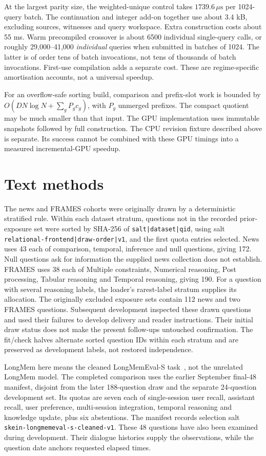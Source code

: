 At the largest parity size, the weighted-unique control takes \(1739.6\,\mu\mathrm{s}\) per 1024-query batch.
The continuation and integer add-on together use about 3.4 kB, excluding sources, witnesses and query workspace.
Extra construction costs about 55 ms.
Warm precompiled crossover is about 6500 individual single-query calls, or roughly 29,000--41,000 \emph{individual} queries when submitted in batches of 1024.
The latter is of order tens of batch invocations, not tens of thousands of batch invocations.
First-use compilation adds a separate cost.
These are regime-specific amortisation accounts, not a universal speedup.

For an overflow-safe sorting build, comparison and prefix-slot work is bounded by
\(O(DN\log N+\sum_gP_gc_g)\), with \(P_g\) unmerged prefixes.
The compact quotient may be much smaller than that input.
The GPU implementation uses immutable snapshots followed by full construction.
The CPU revision fixture described above is separate.
Its success cannot be combined with these GPU timings into a measured incremental-GPU speedup.

\section{Text methods}
\label{app:dm-text}
The news and FRAMES cohorts were originally drawn by a deterministic stratified rule.
Within each dataset stratum, questions not in the recorded prior-exposure set were sorted by SHA-256 of \texttt{salt|dataset|qid}, using salt \texttt{relational-frontend|draw-order|v1}, and the first quota entries selected.
News uses 43 each of comparison, temporal, inference and null questions, giving 172.
Null questions ask for information the supplied news collection does not establish.
FRAMES uses 38 each of Multiple constraints, Numerical reasoning, Post processing, Tabular reasoning and Temporal reasoning, giving 190.
For a question with several reasoning labels, the loader's rarest-label stratum supplies its allocation.
The originally excluded exposure sets contain 112 news and two FRAMES questions.
Subsequent development inspected these drawn questions and used their failures to develop delivery and reader instructions.
Their initial draw status does not make the present follow-ups untouched confirmation.
The fit/check halves alternate sorted question IDs within each stratum and are preserved as development labels, not restored independence.

LongMem here means the cleaned LongMemEval-S task~\cite{longmem}, not the unrelated LongMem model.
The completed comparison uses the earlier September final-48 manifest, disjoint from the later 188-question draw and the separate 24-question development set.
Its quotas are seven each of single-session user recall, assistant recall, user preference, multi-session integration, temporal reasoning and knowledge update, plus six abstentions.
The manifest records selection salt \texttt{skein-longmemeval-s-cleaned-v1}.
These 48 questions have also been examined during development.
Their dialogue histories supply the observations, while the question date anchors requested elapsed times.


